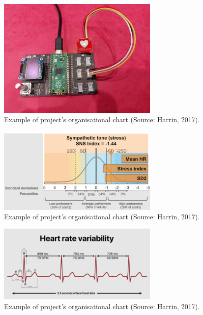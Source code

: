 \documentclass{article}
\begin{document}
\begin{figure}[h]
  \centering
  \includegraphics[width=0.7\textwidth]{raspi_heart.png}
  \caption{ Example of project's organisational chart (Source: Harrin, 2017).}
  \label{harrin}
\end{figure}



\begin{figure}[h]
  \centering
  \includegraphics[width=0.7\textwidth]{sympathetic2.png}
  \caption{ Example of project's organisational chart (Source: Harrin, 2017).}
  \label{harrin}
\end{figure}



\begin{figure}[h]
  \centering
  \includegraphics[width=0.7\textwidth]{heart_rate.png}
  \caption{ Example of project's organisational chart (Source: Harrin, 2017).}
  \label{harrin}
\end{figure}
\end{document}
